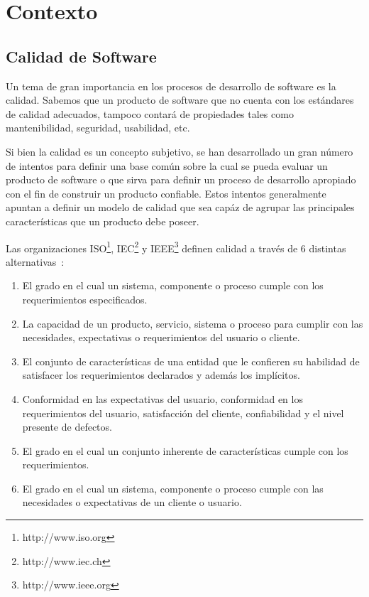
\chapter{Contexto}
\label{chap:contexto}
\section{Calidad de Software}
Un tema de gran importancia en los procesos de desarrollo de software es la calidad.
Sabemos que un producto de software que no cuenta con los estándares de
calidad adecuados, tampoco contará de propiedades tales como mantenibilidad, seguridad, 
usabilidad, etc.

Si bien la calidad es un concepto subjetivo, se han desarrollado un gran
número de intentos para definir una base común sobre la cual se pueda evaluar un producto 
de software o que sirva para definir un proceso de desarrollo apropiado con el fin de construir
un producto confiable. Estos intentos generalmente apuntan a definir un modelo
de calidad que sea capáz de agrupar las principales características que un producto debe poseer.

Las organizaciones ISO\footnote{http://www.iso.org}, IEC\footnote{http://www.iec.ch} y IEEE\footnote{http://www.ieee.org} 
definen calidad a través de 6 distintas alternativas~\cite{5276043}:
\begin{enumerate}
    \item El grado en el cual un sistema, componente o proceso cumple con los requerimientos especificados.
    \item La capacidad de un producto, servicio, sistema o proceso para cumplir con las necesidades, expectativas
    o requerimientos del usuario o cliente.
    \item El conjunto de características de una entidad que le confieren su habilidad de satisfacer los requerimientos
    declarados y además los implícitos.
    \item Conformidad en las expectativas del usuario, conformidad en los requerimientos del usuario, satisfacción del cliente,
    confiabilidad y el nivel presente de defectos.
    \item El grado en el cual un conjunto inherente de características cumple con los requerimientos.
    \item El grado en el cual un sistema, componente o proceso cumple con las necesidades o expectativas de un cliente o usuario.
\end{enumerate}

